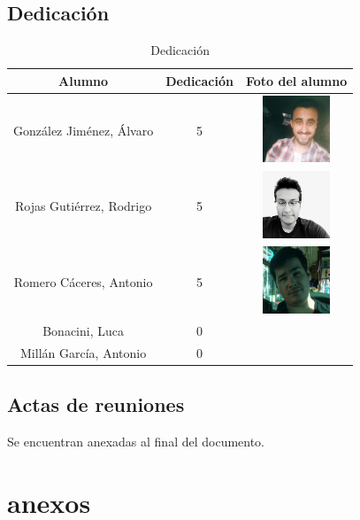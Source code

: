 \documentclass[12pt]{article}
\begin{document}
\subsection{Dedicación}
\begin{table}[H]
\centering
\begin{tabular}{|c|c|c|}
\hline
\textbf{Alumno} & \textbf{Dedicación} & \textbf{Foto del alumno} \\ \hline
González Jiménez, Álvaro & 5 & {\includegraphics[width=2cm, height=2cm]{./alvaro}} \\ \hline
Rojas Gutiérrez, Rodrigo & 5 & {\includegraphics[width=20mm]{./rodrigo}} \\ \hline
Romero Cáceres, Antonio & 5 &  {\includegraphics[width=20mm]{./antonio}}\\ \hline
Bonacini, Luca & 0 & \\ \hline
Millán García, Antonio & 0 &  \\ \hline
\end{tabular}
\caption{Dedicación}
\end{table}

\subsection{Actas de reuniones}
 Se encuentran anexadas al final del documento.
\section{anexos}



\end{document}
